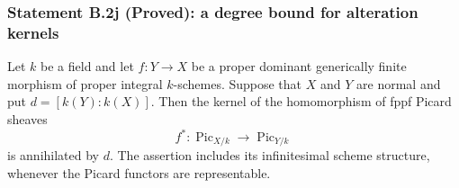 \subsubsection*{Statement B.2j (Proved): a degree bound for alteration kernels}
\begin{lemma}\label{B:B2-alteration-kernel}
Let $k$ be a field and let $f:Y\to X$ be a proper dominant
generically finite morphism of proper integral $k$-schemes.  Suppose
that $X$ and $Y$ are normal and put $d=[k(Y):k(X)]$.  Then the kernel
of the homomorphism of fppf Picard sheaves
\[
 f^*:\operatorname{Pic}_{X/k}\longrightarrow
       \operatorname{Pic}_{Y/k}
\]
is annihilated by $d$.  The assertion includes its infinitesimal
scheme structure, whenever the Picard functors are representable.
\end{lemma}
